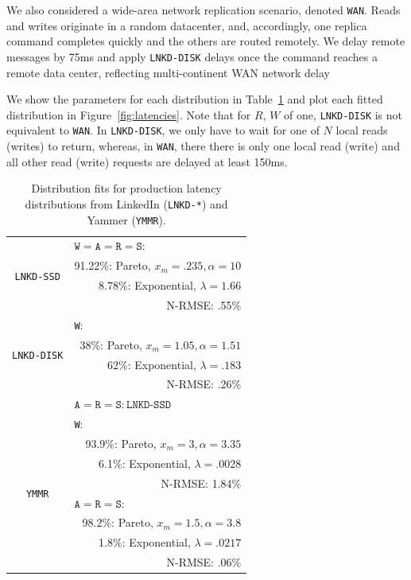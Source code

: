 \documentclass{vldb}
\begin{document}
We also considered a wide-area network replication scenario, denoted
\texttt{WAN}.  Reads and writes originate in a random datacenter, and,
accordingly, one replica command completes quickly and the others are
routed remotely.  We delay remote messages by 75ms and
apply \texttt{LNKD-DISK} delays once the command reaches a remote data
center, reflecting multi-continent WAN network
delay~\cite{dean-keynote}

We show the parameters for each distribution in Table~\ref{table:fits}
and plot each fitted distribution in Figure~\ref{fig:latencies}.  Note
that for $R$, $W$ of one, \texttt{LNKD-DISK} is not equivalent to
\texttt{WAN}. In \texttt{LNKD-DISK}, we only have to wait for one of
$N$ local reads (writes) to return, whereas, in \texttt{WAN}, there
there is only one local read (write) and all other read (write)
requests are delayed at least 150ms.


\begin{table}
\centering
\begin{tabular}{|c|r|}
\hline
\multirow{4}{*}{\texttt{LNKD-SSD}} & \multicolumn{1}{|l|}{$\texttt{W} = \texttt{A}= \texttt{R} = \texttt{S}:$} \\
& 91.22\%: Pareto, $x_m=.235, \alpha=10$\\
& 8.78\%: Exponential, $\lambda = 1.66$ \\
& N-RMSE: .55\%\\\hline
\multirow{4}{*}{\texttt{LNKD-DISK}} & 
 \multicolumn{1}{|l|}{\texttt{W}:}\\
& 38\%: Pareto, $x_m=1.05, \alpha=1.51$\\
& \hfill 62\%: Exponential, $\lambda = .183$ \\
& N-RMSE: .26\%\\\cline{2-2}
& \multicolumn{1}{|l|}{$\texttt{A}= \texttt{R} = \texttt{S}: \texttt{LNKD-SSD}$}\\
\hline
\multirow{8}{*}{\texttt{YMMR}} & \multicolumn{1}{|l|}{\texttt{W}:} \\
& 93.9\%: Pareto, $x_m=3, \alpha=3.35$\\
& 6.1\%: Exponential, $\lambda = .0028$ \\
& N-RMSE: 1.84\%\\\cline{2-2}
& \multicolumn{1}{|l|}{$\texttt{A}= \texttt{R} = \texttt{S}:$}\\
& 98.2\%: Pareto, $x_m=1.5, \alpha=3.8$\\
& 1.8\%: Exponential, $\lambda=.0217$\\
& N-RMSE: .06\%\\
\hline
\end{tabular}
\vspace{-6pt}
\caption{Distribution fits for production latency distributions from LinkedIn (\texttt{LNKD-*}) and Yammer (\texttt{YMMR}).}
\vspace{-12pt}
\label{table:fits}
\end{table}
\end{document}
